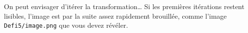 \documentclass[11pt, a4paper]{article}
\begin{document}
\noindent On peut envisager d'itérer la transformation\ldots{} Si les premières itérations restent lisibles, l'image est par la suite
assez rapidement brouillée, comme l'image \texttt{Defi5/image.png} que vous devez révéler.

\begin{figure}[h]
\centering
{}
\hspace{0.3cm}
\\
\hspace{0.3cm}
\end{figure}
\end{document}
